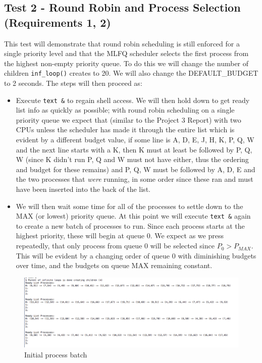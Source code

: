 \documentclass[11pt,letterpaper]{report}
\begin{document}
\subsection*{Test 2 - Round Robin and Process Selection (Requirements 1, 2) }
This test will demonstrate that round robin scheduling is still enforced for a single priority level and that the MLFQ scheduler selects the first process from the highest non-empty priority queue.
To do this we will change the number of children {\tt inf\_loop()} creates to 20. We will also change the DEFAULT\_BUDGET to 2 seconds. The steps will then proceed as:
\begin{itemize}
	
	\item Execute {\tt text \&} to regain shell access. We will then hold down  to get ready list info as quickly as possible; with round robin scheduling on a single priority queue we 
		expect that (similar to the Project 3 Report) with two CPUs unless the scheduler has made it through the entire list which is evident by a different budget value, 
		if some line is  A, D, E, J, H, K, P, Q, W and the next line starts 
		with a K, then K must at least be 
		followed by P, Q, W (since K didn't run P, Q and W must not have either, thus the ordering and budget for these remains) and P, Q, W must be followed by A, D, E and the two processes that \emph{were} running, 
		in some order since these ran and must have been inserted into the back of the list.
	\item We will then wait some time for all of the processes to settle down to the MAX (or lowest) priority queue. At this point we will execute {\tt text \&} again to create a new batch of processes to
		run. Since each process starts at the highest priority, these will begin at queue 0. We expect as we press  repeatedly, that only process from queue 0 will be selected since $P_0>P_{MAX}$. 
		This will be evident by a changing order of queue 0 with diminishing budgets over time, and the budgets on queue MAX remaining constant.
\end{itemize}


\begin{figure}[h]
\centering
\includegraphics[width=0.8\linewidth]{rr-0.png}
\caption{Initial process batch}
\label{fig:1}
\end{figure}
\end{document}
